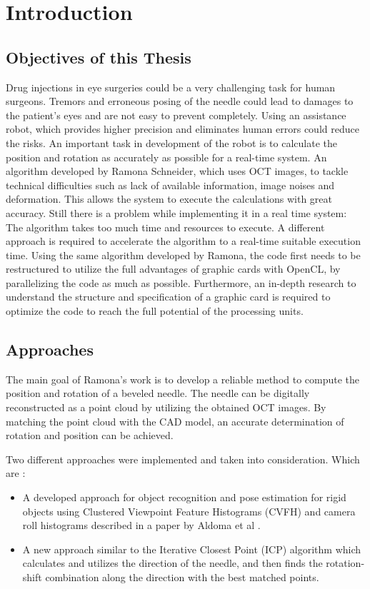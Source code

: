 \chapter{Introduction}
\section{Objectives of this Thesis}

   
Drug injections in eye surgeries could be a very challenging task for human surgeons. Tremors and erroneous posing of the needle could lead to damages to the patient’s eyes and are not easy to prevent completely. Using an assistance robot, which provides higher precision and eliminates human errors could reduce the risks. An important task in development of the robot is to calculate the position and rotation as accurately as possible for a real-time system. An algorithm developed by Ramona Schneider, which uses OCT images, to tackle technical difficulties such as lack of available information, image noises and deformation. This allows the system to execute the calculations with great accuracy. Still there is a problem while implementing it in a real time system: The algorithm takes too much time and resources to execute. A different approach is required to accelerate the algorithm to a real-time suitable execution time. Using the same algorithm developed by Ramona, the code first needs to be restructured to utilize the full advantages of graphic cards with OpenCL, by parallelizing the code as much as possible. Furthermore, an in-depth research to understand the structure and specification of a graphic card is required to optimize the code to reach the full potential of the processing units.
    
\section{Approaches}

The main goal of Ramona’s work is to develop a reliable method to compute the position and rotation of a beveled needle. The needle can be digitally reconstructed as a point cloud by utilizing the obtained OCT images. By matching the point cloud with the CAD model, an accurate determination of rotation and position can be achieved.

Two different approaches were implemented and taken into consideration. Which are \cite{ramona}:

\begin{itemize}
	\item A developed approach for object recognition and pose estimation for rigid objects using Clustered Viewpoint Feature Histograms (CVFH) and camera roll histograms described in a paper by Aldoma et al \cite{aldoma}.

	\item A new approach similar to the Iterative Closest Point (ICP) algorithm which calculates and utilizes the direction of the needle, and then finds the rotation-shift combination along the direction with the best matched points.
\end{itemize} 


